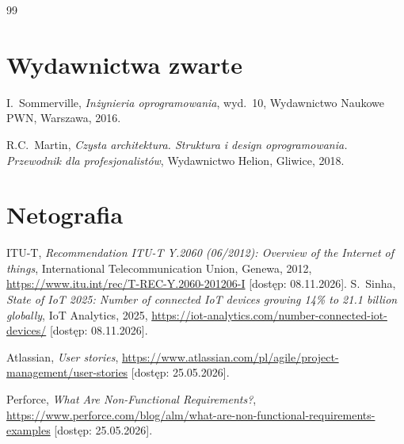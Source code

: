 \begin{thebibliography}{99}
	
	\section*{Wydawnictwa zwarte}
	
	I.~Sommerville,  
	\emph{Inżynieria oprogramowania}, wyd.~10,  
	Wydawnictwo Naukowe PWN, Warszawa, 2016.
	
	R.C.~Martin,  
	\emph{Czysta architektura. Struktura i design oprogramowania. Przewodnik dla profesjonalistów},  
	Wydawnictwo Helion, Gliwice, 2018.
	
	\section*{Netografia}
	
	ITU-T,  
	\emph{Recommendation ITU-T Y.2060 (06/2012): Overview of the Internet of things},  
	International Telecommunication Union, Genewa, 2012,  
	\url{https://www.itu.int/rec/T-REC-Y.2060-201206-I}  
	[dostęp: 08.11.2026].
	S.~Sinha,  
	\emph{State of IoT 2025: Number of connected IoT devices growing 14\% to 21.1 billion globally},  
	IoT Analytics, 2025,  
	\url{https://iot-analytics.com/number-connected-iot-devices/}  
	[dostęp: 08.11.2026].
	
	Atlassian,  
	\emph{User stories},  
	\url{https://www.atlassian.com/pl/agile/project-management/user-stories}  
	[dostęp: 25.05.2026].
	
	Perforce,  
	\emph{What Are Non-Functional Requirements?},  
	\url{https://www.perforce.com/blog/alm/what-are-non-functional-requirements-examples}  
	[dostęp: 25.05.2026].
	
\end{thebibliography}